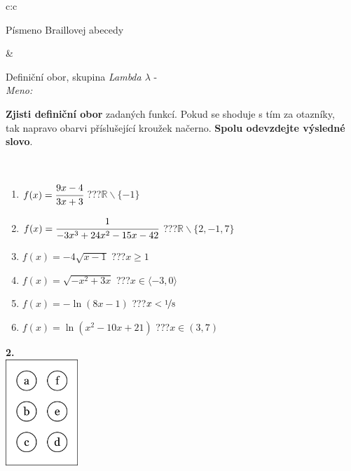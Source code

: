 \documentclass[10pt]{report}
\begin{document}
\begin{tabular}{c:c}
\begin{minipage}[c][104.5mm][t]{0.5\linewidth}
\begin{center}
\begin{minipage}{0.20\linewidth}
\begin{center}
{\small Písmeno Braillovej abecedy}
\end{center}
\end{minipage}
\end{center}
\end{minipage}
&
\begin{minipage}[c][104.5mm][t]{0.5\linewidth}
\begin{center}
\vspace{7mm}
{\huge Definiční obor, skupina \textit{Lambda $\lambda$} -}\\[5mm]
\textit{Meno:}\phantom{xxxxxxxxxxxxxxxxxxxxxxxxxxxxxxxxxxxxxxxxxxxxxxxxxxxxxxxxxxxxxxxxx}\\[5mm]
\begin{minipage}{0.95\linewidth}
\textbf{Zjisti definiční obor} zadaných funkcí. Pokud se shoduje s tím za otazníky,\\tak napravo obarvi příslušející kroužek načerno. \textbf{Spolu odevzdejte výsledné slovo}.
\end{minipage}
\\[1mm]
\begin{minipage}{0.79\linewidth}
\begin{center}
\begin{varwidth}{\linewidth}
\begin{enumerate}
\normalsizerrr
\item $f(x)=\cfrac{9x-4}{3x+3}$\quad \dotfill\; ???\;\dotfill \quad $\mathbb{R}\smallsetminus\{-1\}$
\item $f(x)=\cfrac{1}{-3x^3+24x^2-15x-42}$\quad \dotfill\; ???\;\dotfill \quad $\mathbb{R}\smallsetminus\{2,-1,7\}$
\item $f(x)=-4\sqrt{x-1}$\quad \dotfill\; ???\;\dotfill \quad $x\geq1$
\item $f(x)=\sqrt{-x^2+3x}$\quad \dotfill\; ???\;\dotfill \quad $x\in\langle-3 , 0\rangle$
\item $f(x)=-\ln{(8x-1)}$\quad \dotfill\; ???\;\dotfill \quad $x<\nicefrac{1}{8}$
\item $f(x)=\ln{(x^2-10x+21)}$\quad \dotfill\; ???\;\dotfill \quad $x\in(3 , 7)$
\end{enumerate}
\end{varwidth}
\end{center}
\end{minipage}
\begin{minipage}{0.20\linewidth}
\begin{center}
{\Huge\bfseries 2.} \\[2mm]
\includegraphics[height=40mm]{../images/braille.png}

\end{center}
\end{minipage}
\end{center}
\end{minipage}
\end{tabular}
\end{document}
